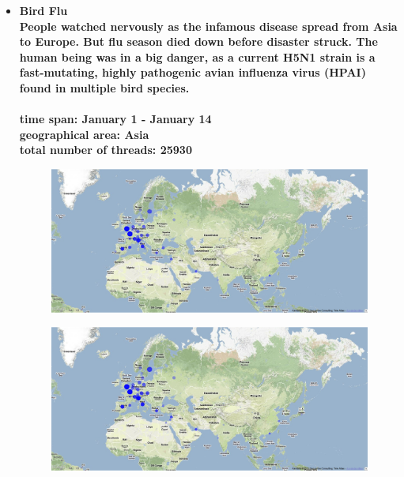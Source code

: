 \documentclass[11pt,a4paper,english]{article}
\begin{document}
				\begin{itemize}
					\item \bf Bird Flu \rm
						\\ People watched nervously as the infamous disease spread from Asia to Europe. But flu season died down before disaster struck. The human being was in a big danger, as a current H5N1 strain is a fast-mutating, highly pathogenic avian influenza virus (HPAI) found in multiple bird species.
						\\\\ \bf time span: \rm January 1 - January 14
						\\ \bf geographical area: \rm Asia
						\\ \bf total number of threads: \rm 25930
						\begin{figure}[H]
							\vspace{-13pt}
  							\begin{center}
								\includegraphics[width=130mm]{img/pre-birdflu}
							\end{center}
							\vspace{-13pt}
						\end{figure}
						\begin{figure}[H]
							\vspace{-13pt}
	  						\begin{center}
								\includegraphics[width=130mm]{img/post-birdflu}
							\end{center}
							\vspace{-13pt}
						\end{figure}
						

\end{itemize}
\end{document}

